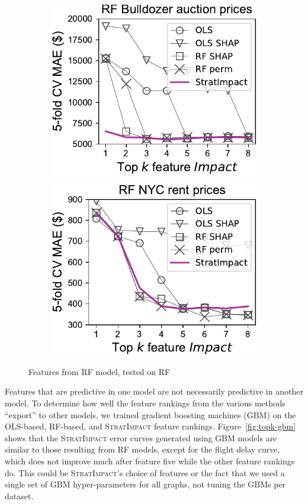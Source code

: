 \documentclass[11pt]{article}
\newcommand{\figref}[1]{Figure~\ref{#1}}
\newcommand{\simp}{\fontfamily{cmr}\textsc{\small StratImpact}}
\begin{document}
\begin{figure}
\begin{subfigure}{.245\textwidth}
    \centering
\includegraphics[scale=0.45]{images/bulldozer-topk-RF-Impact.pdf}
\end{subfigure}%
\hfill
\begin{subfigure}{.245\textwidth}
    \centering
\includegraphics[scale=0.45]{images/rent-topk-RF-Impact.pdf}
\end{subfigure}
\caption[short]{Features from RF model, tested on RF}
\label{fig:topk-impact}
\end{figure}

Features that are predictive in one model are not necessarily predictive in another model.  To determine how well the feature rankings from the various methods ``export'' to other models, we trained gradient boosting machines (GBM) on the OLS-based, RF-based, and \simp{} feature rankings. \figref{fig:topk-gbm} shows that the \simp{} error curves generated using GBM models are similar to those resulting from RF models, except for the flight delay curve, which does not improve much after feature five while the other feature rankings do.  This could be \simp's choice of features or the fact that we used a single set of GBM hyper-parameters for all graphs, not tuning the GBMs per dataset. 
\end{document}
